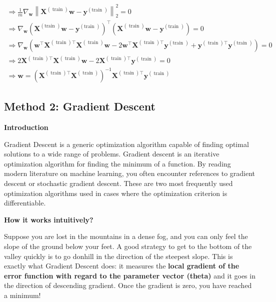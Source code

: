 \documentclass[openany]{book}
\begin{document}
\begin{equation}
\begin{array}{c}
\Rightarrow \frac{1}{m} \nabla_{\boldsymbol{w}}\left\|\boldsymbol{X}^{(\operatorname{train})} \boldsymbol{w}-\boldsymbol{y}^{(\text {train })}\right\|_{2}^{2}=0 \\
\Rightarrow \nabla_{\boldsymbol{w}}\left(\boldsymbol{X}^{(\text {train })} \boldsymbol{w}-\boldsymbol{y}^{(\text {train })}\right)^{\top}\left(\boldsymbol{X}^{(\operatorname{train})} \boldsymbol{w}-\boldsymbol{y}^{(\text {train })}\right)=0 \\
\Rightarrow \nabla_{\boldsymbol{w}}\left(\boldsymbol{w}^{\top} \boldsymbol{X}^{(\operatorname{train}) \top} \boldsymbol{X}^{(\operatorname{train})} \boldsymbol{w}-2 \boldsymbol{w}^{\top} \boldsymbol{X}^{(\operatorname{train}) \top} \boldsymbol{y}^{(\text {train })}+\boldsymbol{y}^{(\operatorname{train}) \top} \boldsymbol{y}^{(\text {train })}\right)=0 \\
\Rightarrow 2 \boldsymbol{X}^{(\operatorname{train}) \top} \boldsymbol{X}^{(\operatorname{train})} \boldsymbol{w}-2 \boldsymbol{X}^{(\operatorname{train}) \top} \boldsymbol{y}^{(\operatorname{train})}=0 \\
\Rightarrow \boldsymbol{w}=\left(\boldsymbol{X}^{(\operatorname{train}) \top} \boldsymbol{X}^{(\operatorname{train})}\right)^{-1} \boldsymbol{X}^{(\operatorname{train}) \top} \boldsymbol{y}^{(\operatorname{train})}
\end{array}
\end{equation}

\subsection{Method 2: Gradient Descent}




\textbf{Introduction}

Gradient Descent is a generic optimization algorithm capable of finding optimal solutions to a wide range of problems.  Gradient descent is an iterative optimization algorithm for finding the minimum of a function. By reading modern literature on machine learning, you often encounter references to gradient descent or stochastic gradient descent. These are two most frequently used optimization algorithms used in cases where the optimization criterion is differentiable.

\textbf{How it works intuitively?}

Suppose you are lost in the mountains in a dense fog, and you can only feel the slope of the ground below your feet. A good strategy to get to the bottom of the valley quickly is to go donhill in the direction of the steepest slope. This is exactly what Gradient Descent does: it measures the \textbf{local gradient of the error function with regard to the parameter vector (theta) }and it goes in the direction of descending gradient. Once the gradient is zero, you have reached a minimum! 
\end{document}
